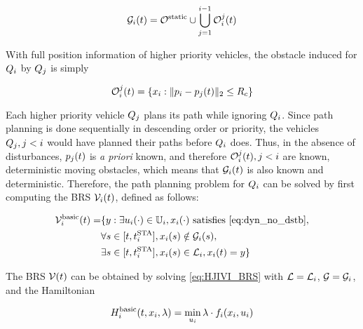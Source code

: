 \begin{equation}
\label{eq:obsseti}
\obsset_i(t)  = \soset \cup \bigcup_{j=1}^{i-1} \ioset_i^j(t)
\end{equation}

With full position information of higher priority vehicles, the obstacle induced for $Q_i$ by $Q_j$ is simply

\begin{equation}
\label{eq:ioset}
\ioset_i^j(t) = \{\state_i: \|\pos_i - \pos_j(t)\|_2 \le \rc \}
\end{equation}

Each higher priority vehicle $Q_j$ plans its path while ignoring $Q_i$. Since path planning is done sequentially in descending order or priority, the vehicles $Q_j, j<i$ would have planned their paths before $Q_i$ does. Thus, in the absence of disturbances, $p_j(t)$ is \textit{a priori} known, and therefore $\mathcal{O}_i^j(t), j<i$ are known, deterministic moving obstacles, which means that $\mathcal{G}_i(t)$ is also known and deterministic. Therefore, the path planning problem for $Q_i$ can be solved by first computing the BRS $\mathcal{V}_i(t)$, defined as follows:

\begin{equation}
\label{eq:BRS_basic}
\begin{aligned}
\brs_i^\text{basic}(t) = & \{y: \exists \ctrl_i(\cdot) \in \cfset_i, \state_i(\cdot) \text{ satisfies \eqref{eq:dyn_no_dstb}}, \\
& \forall s \in [t, \sta_i],\state_i(s) \notin \obsset_i(s), \\
& \exists s \in [t, \sta_i], \state_i(s) \in \targetset_i, \state_i(t) = y\}
\end{aligned}
\end{equation}

The BRS $\mathcal{V}(t)$ can be obtained by solving \eqref{eq:HJIVI_BRS} with $\mathcal{L} = \mathcal{L}_i$, $\mathcal{G} = \mathcal{G}_i$, and the Hamiltonian 

\begin{equation}
\label{eq:basicham}
\ham_i^\text{basic}(t, \state_i, \costate) = \min_{\ctrl_i} \costate \cdot \fdyn_i(\state_i, \ctrl_i)
\end{equation}


